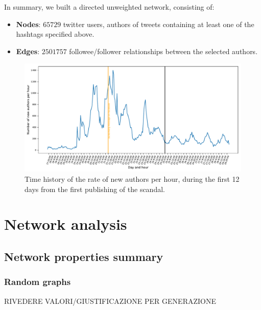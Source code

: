 \documentclass[11pt, twoside]{report}
\begin{document}
    In summary, we built a directed unweighted network, consisting of:

    \begin{itemize}
    \item \textbf{Nodes}: $65729$ twitter users, authors of tweets containing at least one of the hashtags specified above.

    \item \textbf{Edges}: $2501757$ followee/follower relationships between the selected authors.
    \end{itemize}


    
    \begin{figure}[htbp]
      \centering
\includegraphics[width=\textwidth]{../../scripts/network_analysis/imgs/time_history.pdf}
      \caption{Time history of the rate of new authors per hour, during the first 12 days from the first publishing of the scandal.}
      \label{fig:time_history}
    \end{figure}



    
    \chapter{Network analysis}

\section{Network properties summary} 

\begin{table}[htbp]
  \centering

\end{table}

\subsection{Random graphs}
RIVEDERE VALORI/GIUSTIFICAZIONE PER GENERAZIONE
\end{document}
